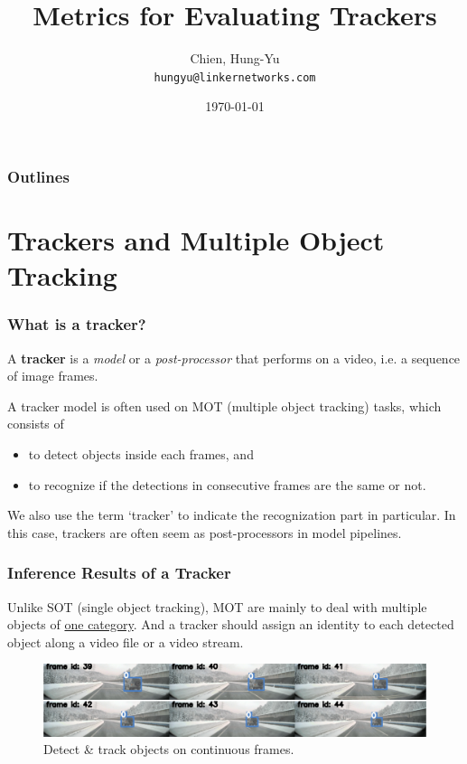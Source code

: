 \documentclass[slidetop, mathserif, dvipsnames]{beamer}
\title[Metrics for Tracking]{Metrics for Evaluating Trackers}
\author[chy1010]{Chien, Hung-Yu \\ {\small\tt hungyu@linkernetworks.com}}
\date{\today}
\begin{document}
\begin{frame}
	\titlepage
\end{frame}

\section[Outline]{}
\begin{frame}
	\frametitle{Outlines}
	\tableofcontents
\end{frame}



\section{Trackers and Multiple Object Tracking}

\begin{frame}
	\frametitle{What is a tracker?}

	A {\bf tracker} is a \emph{model} or a \emph{post-processor}
	that performs on a video, i.e. a sequence of image frames.

	\quad

	A tracker model is often used on MOT (multiple object tracking) tasks,
	which consists of
	\begin{itemize}
	\item
		to detect objects inside each frames, and
	\item
		to recognize if the detections in consecutive frames are the
		same or not.
	\end{itemize}

	\quad

	We also use the term `tracker' to indicate the recognization part
	in particular. In this case, trackers are often seem as post-processors
	in model pipelines.

\end{frame}



\begin{frame}
	\frametitle{Inference Results of a Tracker}

	Unlike SOT (single object tracking), MOT are mainly to deal with
	multiple objects of \underline{one category}.
	And a tracker should assign
	an identity to each detected object along a video file or a video
	stream.

	\begin{figure}
		\includegraphics[width=1.05\textwidth]{pics/track01.png}
		\caption{Detect \& track objects on continuous frames.}
	\end{figure}

\end{frame}
\end{document}
